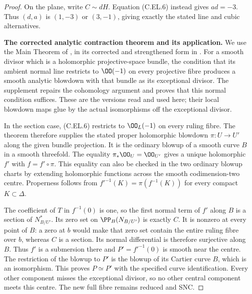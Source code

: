 \begin{proof}
On the plane, write $C\sim dH$. Equation (C.EL.6) instead
gives $ad=-3$. Thus $(d,a)$ is $(1,-3)$ or $(3,-1)$,
giving exactly the stated line and cubic alternatives.

\par\medskip\noindent\textbf{The corrected analytic contraction theorem and its application.}
We use the Main Theorem of \cite[p.~484]{Nakano1970}, in its
corrected and strengthened form in
\cite[\S2, Theorem~2' and Proposition~9']{FujikiNakano1971}.
For a smooth divisor which is a holomorphic projective-space
bundle, the condition that its ambient normal line restricts to
$\OO(-1)$ on every projective fibre produces a smooth analytic
blowdown with that bundle as its exceptional divisor. The
supplement repairs the cohomology argument and proves that this
normal condition suffices. These are the versions read and used
here; their local blowdown maps glue by the actual isomorphisms
off the exceptional divisor.

In the section case, (C.EL.6) restricts to $\OO_L(-1)$ on
every ruling fibre. The theorem therefore supplies the stated
proper holomorphic blowdown $\pi:U\to U'$ along the given
bundle projection. It is the ordinary blowup of a smooth curve
$B$ in a smooth threefold. The equality
$\pi_*\OO_U=\OO_{U'}$ gives a unique holomorphic $f'$ with
$f=f'\circ\pi$. This equality can also be checked in the two
ordinary blowup charts by extending holomorphic functions
across the smooth codimension-two centre. Properness follows
from $f'^{-1}(K)=\pi(f^{-1}(K))$ for every compact
$K\subset\Delta$.

The coefficient of $T$ in $f^{-1}(0)$ is one, so the first
normal term of $f'$ along $B$ is a section of $N_{B/U'}^*$.
Its zero set on $\PP_B(N_{B/U'})$ is exactly $C$.
It is nonzero at every point of $B$: a zero at $b$ would
make that zero set contain the entire ruling fibre over $b$,
whereas $C$ is a section. Its normal differential is therefore
surjective along $B$. Thus $f'$ is a submersion there and
$P'=f'^{-1}(0)$ is smooth near the centre. The restriction of
the blowup to $P'$ is the blowup of its Cartier curve $B$,
which is an isomorphism. This proves $P\simeq P'$ with
the specified curve identification. Every other component
misses the exceptional divisor, so no other central component
meets this centre. The new full fibre remains reduced and SNC.


\end{proof}
